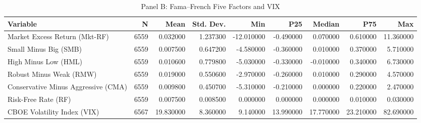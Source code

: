 \begin{table}
\caption{Panel B: Fama–French Five Factors and VIX}
\label{tab:panel_b}
\begin{tabular}{lrrrrrrrr}
\hline\hline
Variable & N & Mean & Std. Dev. & Min & P25 & Median & P75 & Max \\
\hline
Market Excess Return (Mkt-RF) & 6559 & 0.032000 & 1.237300 & -12.010000 & -0.490000 & 0.070000 & 0.610000 & 11.360000 \\
Small Minus Big (SMB) & 6559 & 0.007500 & 0.647200 & -4.580000 & -0.360000 & 0.010000 & 0.370000 & 5.710000 \\
High Minus Low (HML) & 6559 & 0.010600 & 0.779800 & -5.030000 & -0.330000 & -0.010000 & 0.340000 & 6.730000 \\
Robust Minus Weak (RMW) & 6559 & 0.019000 & 0.550600 & -2.970000 & -0.260000 & 0.010000 & 0.290000 & 4.570000 \\
Conservative Minus Aggressive (CMA) & 6559 & 0.009800 & 0.450700 & -5.310000 & -0.210000 & 0.000000 & 0.220000 & 2.470000 \\
Risk-Free Rate (RF) & 6559 & 0.007500 & 0.008500 & 0.000000 & 0.000000 & 0.000000 & 0.010000 & 0.030000 \\
CBOE Volatility Index (VIX) & 6567 & 19.830000 & 8.360000 & 9.140000 & 13.990000 & 17.770000 & 23.210000 & 82.690000 \\
\hline\hline
\end{tabular}
\end{table}
